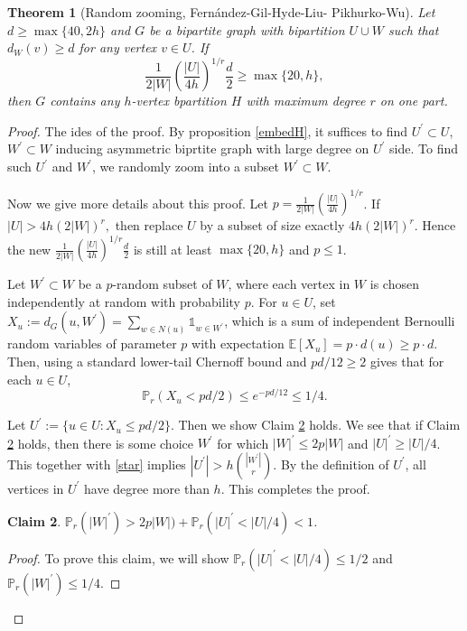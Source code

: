 \documentclass{article}
\newtheorem{theorem}{Theorem}[section]
\newtheorem{claim}[theorem]{Claim}
\theoremstyle{definition}
\begin{document}
\begin{theorem}[Random zooming, Fern\'{a}ndez-Gil-Hyde-Liu-
              Pikhurko-Wu\cite{Wuzhou}]
    Let $d\geq \max\{40,2h\}$ and $G$ be a bipartite graph with bipartition $U\cup W$ such that $d_W(v)\geq d$ for any vertex $v\in U$. If 
    \begin{equation}\label{star}
        \frac{1}{2|W|}\left(\frac{|U|}{4h}\right)^{1/r}\frac{d}{2}\geq \max\{20,h\},
    \end{equation}
    then $G$ contains any $h$-vertex bpartition $H$ with maximum degree $r$ on one part. 
\end{theorem}
\begin{proof}
  The ides of the proof. By proposition \ref{embedH}, it suffices to find $U^\prime \subset U$, $W^\prime \subset W$ inducing asymmetric biprtite graph with large  degree on $U^\prime $ side. To find such $U^\prime$ and $W^\prime$, we randomly zoom into a subset $W^\prime\subset W$.

  Now we give more details about this proof. Let $p=\frac{1}{2|W|}\left(\frac{|U|}{4h}\right)^{1/r}$. If $|U|>4h(2|W
|)^r,$ then replace $U$ by a subset of size exactly $4h(2|W|)^r$. Hence the new  $\frac{1}{2|W|}\left(\frac{|U|}{4h}\right)^{1/r}\frac{d}{2}$ is still at least $\max\{20,h\}$ and $p\leq 1$.

  Let $W^\prime \subset W $ be a $p$-random subset of $W$, where each vertex in $W$ is chosen independently at random with probability $p$. For $u\in U$, set $X_u:=d_G(u,W^\prime)=\sum_{w\in N(u)} \mathbb{1}_{w\in W^\prime}$, which is a sum of independent Bernoulli random variables of parameter $p$ with expectation $\mathbb{E}[X_u]=p\cdot d(u)\geq p\cdot d$. Then, using a standard lower-tail Chernoff bound and $pd/12\geq 2$ gives that for each $u\in U$,
  $$\mathbb{P}_r(X_u<pd/2)\leq e^{-pd/12}\leq 1/4.$$
  
Let $U^\prime:=\{u\in U:X_u\leq pd/2\}$. Then we show Claim \ref{claim1} holds. We see that if Claim \ref{claim1} holds, then 
there is some choice $W^\prime$ for which $|W|^\prime\leq 2p|W|$ and  $|U|^\prime\geq |U|/4$. This together with \ref{star} implies $|U^\prime|> h\binom{|W^\prime|}{r}$. By the definition of  $U^\prime$, all vertices in $U^\prime$ have degree  more than $h$. This completes the proof.  

\begin{claim}\label{claim1}
 $\mathbb{P}_r(|W|^\prime)> 2p|W|)+\mathbb{P}_r(|U|^\prime< |U|/4)<1 $.   
\end{claim}
\begin{proof}
To prove this claim, we will show   $\mathbb{P}_r(|U|^\prime< |U|/4)\leq 1/2$ and $\mathbb{P}_r(|W|^\prime)\leq 1/4$. 


\end{proof}
\end{proof}
\end{document}

